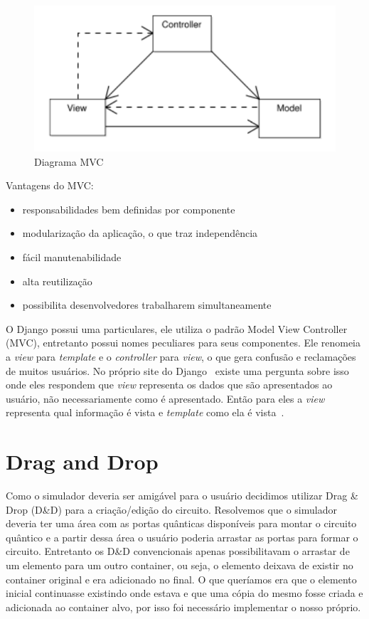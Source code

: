 \documentclass[a4paper, 12pt, oneside]{book}
\begin{document}
\begin{figure}[H]
\centering
\includegraphics[scale=0.4]{mvc.png}
\caption{Diagrama MVC \cite{mvc-murta}}
\label{fig:mvc}
\end{figure}

Vantagens do MVC:
\begin{itemize}
\item responsabilidades bem definidas por componente
\item modularização da aplicação, o que traz independência 
\item fácil manutenabilidade
\item alta reutilização
\item possibilita desenvolvedores trabalharem simultaneamente
\end{itemize}

O Django possui uma particulares, ele utiliza o padrão Model View Controller (MVC), entretanto possui nomes peculiares para seus componentes. Ele renomeia a \textit{view} para \textit{template} e o \textit{controller} para \textit{view}, o que gera confusão e reclamações de muitos usuários. No próprio site do Django~\cite{django} existe uma pergunta sobre isso onde eles respondem que \textit{view} representa os dados que são apresentados ao usuário, não necessariamente como é apresentado. Então para eles a \textit{view} representa qual informação é vista e \textit{template} como ela é vista~\cite{django-mvc}.

\section{Drag and Drop} \label{sec:dragdrop}

Como o simulador deveria ser amigável para o usuário decidimos utilizar Drag \& Drop (D\&{D}) para a criação/edição do circuito. Resolvemos que o simulador deveria ter uma área com as portas quânticas disponíveis para montar o circuito quântico e a partir dessa área o usuário poderia arrastar as portas para formar o circuito. Entretanto os D\&{D} convencionais apenas possibilitavam o arrastar de um elemento para um outro container, ou seja, o elemento deixava de existir no container original e era adicionado no final. O que queríamos era que o elemento inicial continuasse existindo onde estava e que uma cópia do mesmo fosse criada e adicionada ao container alvo, por isso foi necessário implementar o nosso próprio.
\end{document}
